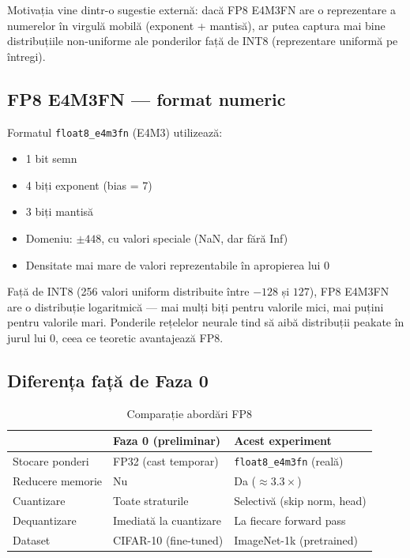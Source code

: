 \documentclass[12pt,a4paper]{article}
\begin{document}
Motivația vine dintr-o sugestie externă: dacă FP8 E4M3FN are o reprezentare
a numerelor în virgulă mobilă (exponent + mantisă), ar putea captura mai
bine distribuțiile non-uniforme ale ponderilor față de INT8 (reprezentare
uniformă pe întregi).

\subsection{FP8 E4M3FN --- format numeric}

Formatul \texttt{float8\_e4m3fn} (E4M3) utilizează:
\begin{itemize}
  \item 1 bit semn
  \item 4 biți exponent (bias = 7)
  \item 3 biți mantisă
  \item Domeniu: $\pm 448$, cu valori speciale (NaN, dar fără Inf)
  \item Densitate mai mare de valori reprezentabile în apropierea lui 0
\end{itemize}

Față de INT8 (256 valori uniform distribuite între $-128$ și $127$),
FP8 E4M3FN are o distribuție logaritmică --- mai mulți biți pentru
valorile mici, mai puțini pentru valorile mari. Ponderile rețelelor
neurale tind să aibă distribuții peakate în jurul lui 0, ceea ce
teoretic avantajează FP8.

\subsection{Diferența față de Faza 0}

\begin{table}[H]
  \centering
  \caption{Comparație abordări FP8}
  \begin{tabular}{lll}
    \toprule
    & \textbf{Faza 0 (preliminar)} & \textbf{Acest experiment} \\
    \midrule
    Stocare ponderi   & FP32 (cast temporar)   & \texttt{float8\_e4m3fn} (reală) \\
    Reducere memorie  & Nu                      & Da ($\approx 3.3\times$) \\
    Cuantizare        & Toate straturile        & Selectivă (skip norm, head) \\
    Dequantizare      & Imediată la cuantizare  & La fiecare forward pass \\
    Dataset           & CIFAR-10 (fine-tuned)   & ImageNet-1k (pretrained) \\
    \bottomrule
  \end{tabular}
  \label{tab:fp8_comparison}
\end{table}
\end{document}
